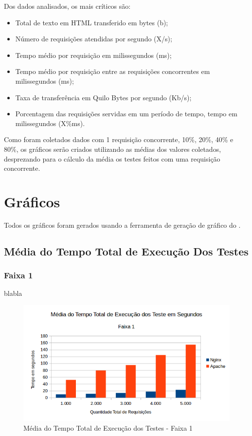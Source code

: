 Dos dados analisados, os mais críticos são:

\begin{itemize}
	\item Total de texto em HTML transferido em bytes (b);
	\item Número de requisições atendidas por segundo (X/s);
	\item Tempo médio por requisição em milissegundos (ms);
	\item Tempo médio por requisição entre as requisições concorrentes em milissegundos (ms);
	\item Taxa de transferência em Quilo Bytes por segundo (Kb/s);
	\item Porcentagem das requisições servidas em um período de tempo, tempo em milissegundos (X\%ms).
\end{itemize}

Como foram coletados dados com 1 requisição concorrente, 10\%, 20\%, 40\% e 80\%, os gráficos serão criados utilizando as médias dos valores coletados, desprezando para o cálculo da média os testes feitos com uma requisição concorrente.

\section{Gráficos}
Todos os gráficos foram gerados usando a ferramenta de geração de gráfico do .
\subsection{Média do Tempo Total de Execução Dos Testes}
\subsubsection{Faixa 1}

blabla
\begin{figure}[htb]
	\centering
	\includegraphics[width=0.6\linewidth]{graficos/grafico1-f1} 
	\caption{Média do Tempo Total de Execução dos Testes - Faixa 1}
	\label{fig:grafico1-f1}
\end{figure}

